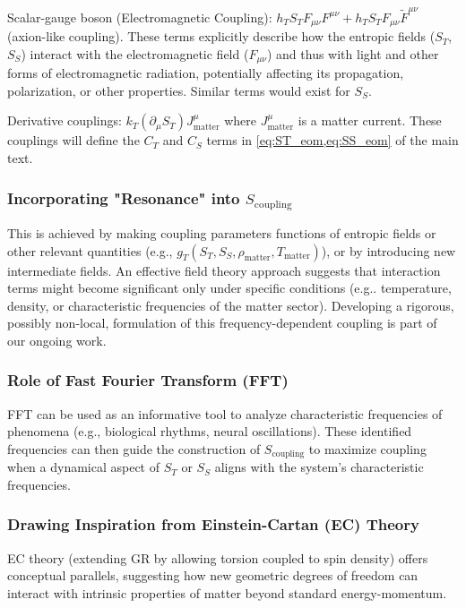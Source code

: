 \documentclass[11pt,a4paper]{article} %
\newcommand{\ST}{S_T}
\newcommand{\SSp}{S_S} %
\newcommand{\Scoupling}{S_{\text{coupling}}}
\begin{document}
Scalar-gauge boson (Electromagnetic Coupling): $h_T\ST F_{\mu\nu}F^{\mu\nu}+ h_T\ST F_{\mu\nu}\tilde{F}^{\mu\nu}$ (axion-like coupling). These terms explicitly describe how the entropic fields ($\ST$,$\SSp$) interact with the electromagnetic field ($F_{\mu\nu}$) and thus with light and other forms of electromagnetic radiation, potentially affecting its propagation, polarization, or other properties. Similar terms would exist for $\SSp$.

Derivative couplings: $k_T(\partial_\mu\ST)J^\mu_{\text{matter}}$ where $J^\mu_{\text{matter}}$ is a matter current. These couplings will define the $C_T$ and $C_S$ terms in \cref{eq:ST_eom,eq:SS_eom} of the main text.

\subsubsection{Incorporating "Resonance" into $\Scoupling$}
\label{app:A.2.3}
This is achieved by making coupling parameters functions of entropic fields or other relevant quantities (e.g., $g_T(\ST,\SSp,\rho_{\text{matter}},T_{\text{matter}})$), or by introducing new intermediate fields. An effective field theory approach suggests that interaction terms might become significant only under specific conditions (e.g.. temperature, density, or characteristic frequencies of the matter sector). Developing a rigorous, possibly non-local, formulation of this frequency-dependent coupling is part of our ongoing work.

\subsubsection{Role of Fast Fourier Transform (FFT)}
FFT can be used as an informative tool to analyze characteristic frequencies of phenomena (e.g., biological rhythms, neural oscillations). These identified frequencies can then guide the construction of $\Scoupling$ to maximize coupling when a dynamical aspect of $\ST$ or $\SSp$ aligns with the system's characteristic frequencies.

\subsubsection{Drawing Inspiration from Einstein-Cartan (EC) Theory}
EC theory (extending GR by allowing torsion coupled to spin density)\cite{Kibble1961,Sciama1964} offers conceptual parallels, suggesting how new geometric degrees of freedom can interact with intrinsic properties of matter beyond standard energy-momentum.
\end{document}
